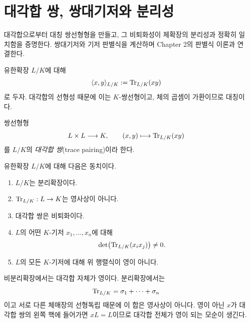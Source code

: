 \clearpage
\section{대각합 쌍, 쌍대기저와 분리성}
\label{sec:trace-pairing-separability}

\begin{learninggoal}
대각합으로부터 대칭 쌍선형형을 만들고, 그 비퇴화성이 체확장의 분리성과 정확히 일치함을 증명한다. 쌍대기저와 기저 판별식을 계산하며 Chapter 2의 판별식 이론과 연결한다.
\end{learninggoal}

유한확장 $L/K$에 대해
\[
  \langle x,y\rangle_{L/K}
  :=\operatorname{Tr}_{L/K}(xy)
\]
로 두자. 대각합의 선형성 때문에 이는 $K$-쌍선형이고,
체의 곱셈이 가환이므로 대칭이다.

\begin{definition}[대각합 쌍]
\label{def:trace-pairing}
쌍선형형
\[
  L\times L\longrightarrow K,
  \qquad
  (x,y)\longmapsto\operatorname{Tr}_{L/K}(xy)
\]
를 $L/K$의 \emph{대각합 쌍}(trace pairing)이라 한다.
\end{definition}

\begin{theorem}
\label{thm:trace-pairing-separability}
유한확장 $L/K$에 대해 다음은 동치이다.
\begin{enumerate}[label=(\roman*)]
  \item $L/K$는 분리확장이다.
  \item $\operatorname{Tr}_{L/K}:L\to K$는 영사상이 아니다.
  \item 대각합 쌍은 비퇴화이다.
  \item $L$의 어떤 $K$-기저 $x_1,\dots,x_n$에 대해
  \[
    \det\bigl(\operatorname{Tr}_{L/K}(x_ix_j)\bigr)\ne0.
  \]
  \item $L$의 모든 $K$-기저에 대해 위 행렬식이 영이 아니다.
\end{enumerate}
\end{theorem}

\begin{proofidea}
비분리확장에서는 대각합 자체가 영이다. 분리확장에서는
\[
  \operatorname{Tr}_{L/K}=\sigma_1+\cdots+\sigma_n
\]
이고 서로 다른 체매장의 선형독립 때문에 이 합은 영사상이 아니다.
영이 아닌 $x$가 대각합 쌍의 왼쪽 핵에 들어가면 $xL=L$이므로
대각합 전체가 영이 되는 모순이 생긴다.
\end{proofidea}

